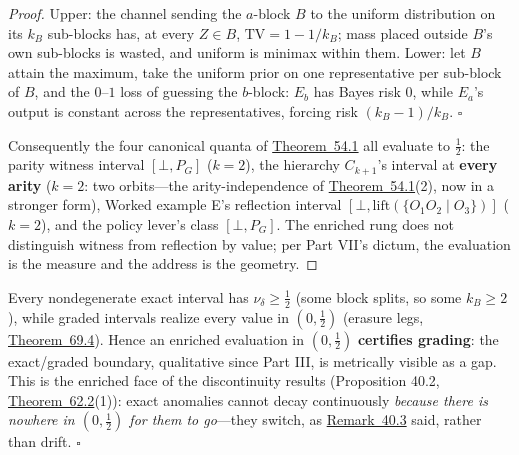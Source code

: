 \begin{proof}

Upper: the channel sending the \(a\)-block \(B\) to the uniform distribution on its \(k_B\) sub-blocks has, at every \(Z \in B\), \(\mathrm{TV} = 1 - 1/k_B\); mass placed outside \(B\)'s own sub-blocks is wasted, and uniform is minimax within them. Lower: let \(B\) attain the maximum, take the uniform prior on one representative per sub-block of \(B\), and the \(0\)--\(1\) loss of guessing the \(b\)-block: \(E_b\) has Bayes risk \(0\), while \(E_a\)'s output is constant across the representatives, forcing risk \((k_B - 1)/k_B\). \(\square\)

Consequently the four canonical quanta of \hyperlink{stmt:54.1}{Theorem~54.1} all evaluate to \(\tfrac12\): the parity witness interval \([\bot, P_G]\) (\(k = 2\)), the hierarchy \(C_{k+1}\)'s interval at \textbf{every arity} (\(k = 2\): two orbits---\hspace{0pt}the arity-independence of \hyperlink{stmt:54.1}{Theorem~54.1}(2), now in a stronger form), Worked example E's reflection interval \([\bot, \mathrm{lift}(\{O_1O_2 \mid O_3\})]\) (\(k = 2\)), and the policy lever's class \([\bot, P_G]\). The enriched rung does not distinguish witness from reflection by value; per Part VII's dictum, the evaluation is the measure and the address is the geometry.
\end{proof}

\begin{thmplain}

Every nondegenerate exact interval has \(\nu_\delta \ge \tfrac12\) (some block splits, so some \(k_B \ge 2\)), while graded intervals realize every value in \((0, \tfrac12)\) (erasure legs, \hyperlink{stmt:69.4}{Theorem~69.4}). Hence an enriched evaluation in \((0, \tfrac12)\) \textbf{certifies grading}: the exact/graded boundary, qualitative since Part III, is metrically visible as a gap. This is the enriched face of the discontinuity results (Proposition 40.2, \hyperlink{stmt:62.2}{Theorem~62.2}(1)): exact anomalies cannot decay continuously \emph{because there is nowhere in \((0, \tfrac12)\) for them to go}---\hspace{0pt}they switch, as \hyperlink{stmt:40.3}{Remark~40.3} said, rather than drift. \(\square\)
\end{thmplain}



